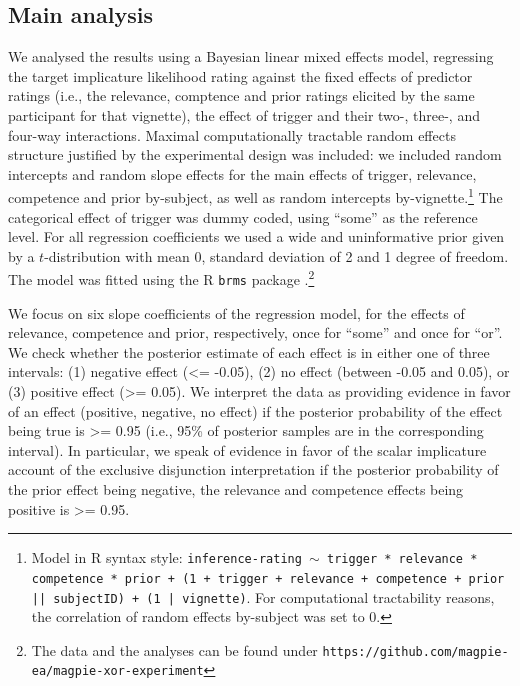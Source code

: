 \documentclass{sp}
\begin{document}
\subsection{Main analysis}
We analysed the results using a Bayesian linear mixed effects model, regressing the target implicature likelihood rating against the fixed effects of predictor ratings (i.e., the relevance, comptence and prior ratings elicited by the same participant for that vignette), the effect of trigger and their two-, three-, and four-way interactions. Maximal computationally tractable random effects structure justified by the experimental design was included: we included random intercepts and random slope effects for the main effects of trigger, relevance, competence and prior by-subject, as well as random intercepts by-vignette.\footnote{Model in R syntax style: \texttt{inference-rating $\sim$ trigger * relevance * competence * prior + (1 + trigger + relevance + competence + prior || subjectID) + (1 | vignette)}. For computational tractability reasons, the correlation of random effects by-subject was set to 0.} 
The categorical effect of trigger was dummy coded, using ``some'' as the reference level. For all regression coefficients we used a wide and uninformative prior given by a $t$-distribution with mean 0, standard deviation of 2 and 1 degree of freedom. The model was fitted using the R \texttt{brms} package \citep{burkner2017brms}.\footnote{The data and the analyses can be found under \texttt{https://github.com/magpie-ea/magpie-xor-experiment}}

We focus on six slope coefficients of the regression model, for the effects of relevance, competence and prior, respectively, once for ``some'' and once for ``or''. We check whether the posterior estimate of each effect is in either one of three intervals: (1) negative effect (<= -0.05), (2) no effect (between -0.05 and 0.05), or (3) positive effect (>= 0.05). 
We interpret the data as providing evidence in favor of an effect (positive, negative, no effect) if the posterior probability of the effect being true is >= 0.95 (i.e., 95\% of posterior samples are in the corresponding interval). In particular, we speak of evidence in favor of the scalar implicature account of the exclusive disjunction interpretation if the posterior probability of the prior effect being negative, the relevance and competence effects being positive is >= 0.95. 
\end{document}
